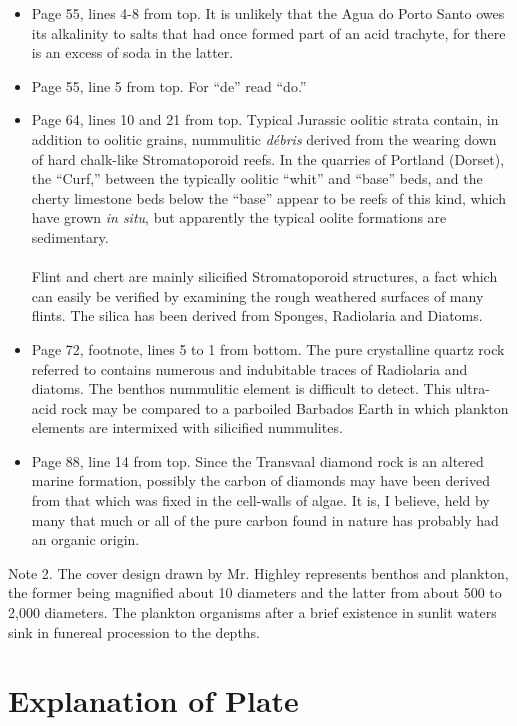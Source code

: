 \documentclass[a4paper, 12pt, oneside]{article}
\begin{document}
\begin{itemize}
    \item Page 55, lines 4-8 from top. It is unlikely that the Agua do Porto Santo owes its alkalinity to salts that had once formed part of an acid trachyte, for there is an excess of soda in the latter.

    \item Page 55, line 5 from top. For ``de'' read ``do.''

    \item Page 64, lines 10 and 21 from top. Typical Jurassic oolitic strata contain, in addition to oolitic grains, nummulitic \emph{débris} derived from the wearing down of hard chalk-like Stromatoporoid reefs. In the quarries of Portland (Dorset), the ``Curf,'' between the typically oolitic ``whit'' and ``base'' beds, and the cherty limestone beds below the ``base'' appear to be reefs of this kind, which have grown \emph{in situ}, but apparently the typical oolite formations are sedimentary.\\ \\ Flint and chert are mainly silicified Stromatoporoid structures, a fact which can easily be verified by examining the rough weathered surfaces of many flints. The silica has been derived from Sponges, Radiolaria and Diatoms.

    \item Page 72, footnote, lines 5 to 1 from bottom. The pure crystalline quartz rock referred to contains numerous and indubitable traces of Radiolaria and diatoms. The benthos nummulitic element is difficult to detect. This ultra-acid rock may be compared to a parboiled Barbados Earth in which plankton elements are intermixed with silicified nummulites.

    \item Page 88, line 14 from top. Since the Transvaal diamond rock is an altered marine formation, possibly the carbon of diamonds may have been derived from that which was fixed in the cell-walls of algae. It is, I believe, held by many that much or all of the pure carbon found in nature has probably had an organic origin.
\end{itemize}
Note 2. The cover design drawn by Mr. Highley represents benthos and plankton, the former being magnified about 10 diameters and the latter from about 500 to 2,000 diameters. The plankton organisms after a brief existence in sunlit waters sink in funereal procession to the depths.
\clearpage
\section{Explanation of Plate}
\end{document}
